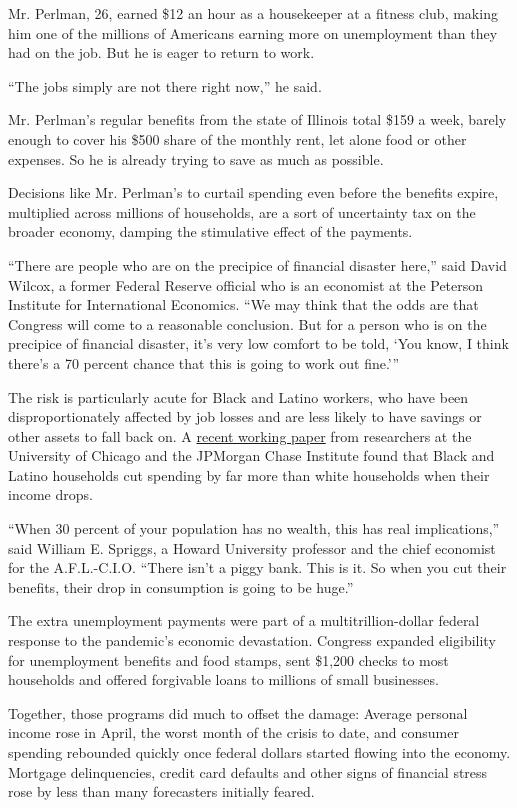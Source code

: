 Mr. Perlman, 26, earned \$12 an hour as a housekeeper at a fitness club,
making him one of the millions of Americans earning more on unemployment
than they had on the job. But he is eager to return to work.

``The jobs simply are not there right now,'' he said.

Mr. Perlman's regular benefits from the state of Illinois total \$159 a
week, barely enough to cover his \$500 share of the monthly rent, let
alone food or other expenses. So he is already trying to save as much as
possible.

Decisions like Mr. Perlman's to curtail spending even before the
benefits expire, multiplied across millions of households, are a sort of
uncertainty tax on the broader economy, damping the stimulative effect
of the payments.

``There are people who are on the precipice of financial disaster
here,'' said David Wilcox, a former Federal Reserve official who is an
economist at the Peterson Institute for International Economics. ``We
may think that the odds are that Congress will come to a reasonable
conclusion. But for a person who is on the precipice of financial
disaster, it's very low comfort to be told, `You know, I think there's a
70 percent chance that this is going to work out fine.'''

The risk is particularly acute for Black and Latino workers, who have
been disproportionately affected by job losses and are less likely to
have savings or other assets to fall back on. A
\href{https://www.nber.org/papers/w27552}{recent working paper} from
researchers at the University of Chicago and the JPMorgan Chase
Institute found that Black and Latino households cut spending by far
more than white households when their income drops.

``When 30 percent of your population has no wealth, this has real
implications,'' said William E. Spriggs, a Howard University professor
and the chief economist for the A.F.L.-C.I.O. ``There isn't a piggy
bank. This is it. So when you cut their benefits, their drop in
consumption is going to be huge.''

The extra unemployment payments were part of a multitrillion-dollar
federal response to the pandemic's economic devastation. Congress
expanded eligibility for unemployment benefits and food stamps, sent
\$1,200 checks to most households and offered forgivable loans to
millions of small businesses.

Together, those programs did much to offset the damage: Average personal
income rose in April, the worst month of the crisis to date, and
consumer spending rebounded quickly once federal dollars started flowing
into the economy. Mortgage delinquencies, credit card defaults and other
signs of financial stress rose by less than many forecasters initially
feared.

